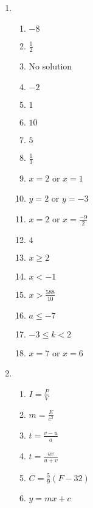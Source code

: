 {\begin{multicols}{3}
 
\begin{enumerate}[noitemsep, label=\textbf{\arabic*}. ] 
 \item %
\begin{enumerate}[noitemsep,label=\textbf{(\alph*)}]
\item $-8$%
\item $\frac{1}{2}$%
\item No solution%
\item $-2$%
\item $1$%
\item $10$%
\item $5$%
\item $\frac{1}{3}$%
\item $x = 2$ or $ x = 1$%
\item $y = 2$ or $y = -3$%
\item $x =2$ or $x = \frac{-9}{2}$%
\item $4$%
\item $x\geq 2$%
\item $x<-1$%
\item $x>\frac{588}{10}$%
\item $a\leq -7$%
\item $-3\leq k<2$%
\item $x = 7$ or $x = 6$%

\end{enumerate}

\item %
\begin{enumerate}[itemsep=1pt,label=\textbf{(\alph*)}]
\item $I=\frac{P}{V}$
\item $m=\frac{E}{c^2}$
\item $t=\frac{v-u}{a}$
\item $t=\frac{uv}{u+v}$
\item $C=\frac{5}{9}(F-32)$
\item $y=mx+c$
\end{enumerate}


\end{enumerate}
\end{multicols}}
